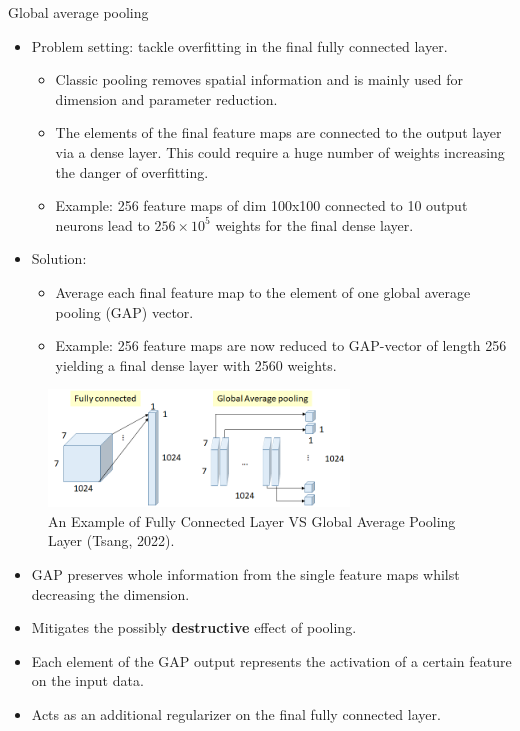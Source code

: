 \begin{vbframe}{Global average pooling}
    \begin{itemize}
        \item Problem setting: tackle overfitting in the final fully connected layer.
        \begin{itemize}
        \item Classic pooling removes spatial information and is mainly used for dimension and parameter reduction.
        \item The elements of the final feature maps are connected to the output layer via a dense layer. This could require a huge number of weights increasing the danger of overfitting.
        \item Example: 256 feature maps of dim 100x100 connected to 10 output neurons lead to $256\times 10^5$ weights for the final dense layer.
        \end{itemize}
        

\framebreak 

        \item Solution: 
        \begin{itemize}
            \item Average each final feature map to the element of one global average pooling (GAP) vector.
            \item Example: 256 feature maps are now reduced to GAP-vector of length 256 yielding a final dense layer with 2560 weights.
        \end{itemize}
    \end{itemize}

    \begin{figure}
        \centering
        \includegraphics[width=8cm]{plots/moderncnn/GAP.png}
        \small{\caption{An Example of Fully Connected Layer VS Global Average Pooling Layer (Tsang, 2022).}}
    \end{figure}

\framebreak

    \begin{itemize}
        \item GAP preserves whole information from the single feature maps whilst decreasing the dimension.
        \item Mitigates the possibly \textbf{destructive} effect of pooling.
        \item Each element of the GAP output represents the activation of a certain feature on the input data.
        \item Acts as an additional regularizer on the final fully connected layer.
    \end{itemize}

\end{vbframe}


